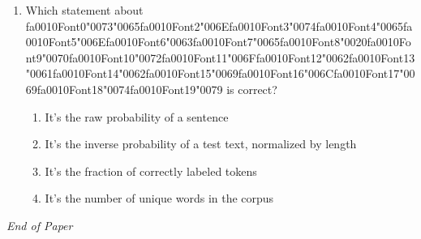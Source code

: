 \documentclass[12pt]{article}
\begin{document}
\begin{enumerate}[label=Q\arabic*.]
\begin{enumerate}[label=(\Alph*)]
\end{enumerate}
\item Which statement about {\csname fa0010Font0\endcsname\char"0073}{\char"0065}{\csname fa0010Font2\endcsname\char"006E}{\csname fa0010Font3\endcsname\char"0074}{\csname fa0010Font4\endcsname\char"0065}{\csname fa0010Font5\endcsname\char"006E}{\csname fa0010Font6\endcsname\char"0063}{\csname fa0010Font7\endcsname\char"0065}{\csname fa0010Font8\endcsname\char"0020}{\csname fa0010Font9\endcsname\char"0070}{\csname fa0010Font10\endcsname\char"0072}{\csname fa0010Font11\endcsname\char"006F}{\csname fa0010Font12\endcsname\char"0062}{\csname fa0010Font13\endcsname\char"0061}{\csname fa0010Font14\endcsname\char"0062}{\csname fa0010Font15\endcsname\char"0069}{\csname fa0010Font16\endcsname\char"006C}{\csname fa0010Font17\endcsname\char"0069}{\csname fa0010Font18\endcsname\char"0074}{\csname fa0010Font19\endcsname\char"0079} is correct?
\begin{enumerate}[label=(\Alph*)]
    \item It's the raw probability of a sentence
    \item It's the inverse probability of a test text, normalized by length
    \item It's the fraction of correctly labeled tokens
    \item It's the number of unique words in the corpus
\end{enumerate}
\end{enumerate}

\vfill
\noindent\textit{End of Paper}
\end{document}
